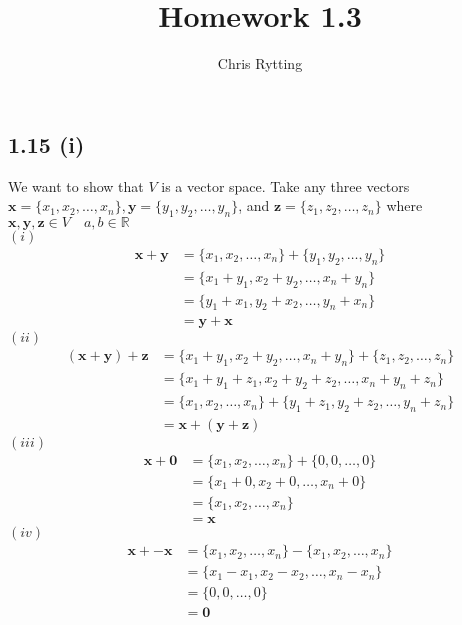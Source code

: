 \documentclass[letterpaper,12pt]{article}
\theoremstyle{definition}
\begin{document}
\title{Homework 1.3} 
\author{Chris Rytting} 
\maketitle

\subsection*{1.15 (i)}
We want to show that $V$ is a vector space. Take any three vectors $\mathbf{x}  = \{x_1, x_2, \dots, x_n\}, \mathbf{y}  = \{y_1, y_2, \dots, y_n\}$, and $\mathbf{z}  = \{z_1, z_2, \dots, z_n\}$ where $\mathbf{x}, \mathbf{y}, \mathbf{z}  \in V \quad a,b \in \mathbb{R} $
\\
$(i)$\\
\begin{align*}
\mathbf{x} + \mathbf{y}   &= \{x_1, x_2, \dots, x_n\} + \{y_1, y_2, \dots, y_n\} \\&= \{x_1 + y_1, x_2 + y_2, \dots, x_n + y_n\} \\&= \{y_1 + x_1, y_2 + x_2, \dots, y_n + x_n\} \\&= \mathbf{y} + \mathbf{x} 
\end{align*}
$(ii)$\\
\begin{align*}
(\mathbf{x} + \mathbf{y}) + \mathbf{z}    &=\{x_1 + y_1, x_2 + y_2, \dots, x_n + y_n\} + \{z_1, z_2, \dots, z_n\}  \\&=\{x_1 + y_1 + z_1, x_2 + y_2 + z_2, \dots, x_n + y_n + z_n\} \\&=\{x_1, x_2, \dots, x_n\} + \{y_1 + z_1, y_2 + z_2, \dots, y_n + z_n\}  \\&= \mathbf{x} + (\mathbf{y} + \mathbf{z})
\end{align*}
$(iii)$\\
\begin{align*}
    \mathbf{x}+\mathbf{0} &= \{x_1, x_2, \dots, x_n\} + \{0, 0, \dots, 0\} 
    \\&= \{x_1 + 0, x_2 + 0, \dots, x_n + 0\} \\&=\{x_1, x_2, \dots, x_n\} \\&= \mathbf{x} 
\end{align*}
$(iv)$\\
\begin{align*}
    \mathbf{x}+ -\mathbf{x} &= \{x_1, x_2, \dots, x_n\} - \{x_1, x_2, \dots, x_n\} \\&= \{x_1 - x_1, x_2 - x_2, \dots, x_n - x_n\} \\&= \{0,0,\dots,0\} \\&=  \mathbf{0} 
\end{align*}
\end{document}
